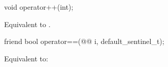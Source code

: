 %
\begin{itemdecl}
void operator++(int);
\end{itemdecl}

\begin{itemdescr}
\pnum
\effects
Equivalent to .
\end{itemdescr}

%
\begin{itemdecl}
friend bool operator==(@@ i, default_sentinel_t);
\end{itemdecl}

\begin{itemdescr}
\pnum
\effects
Equivalent to: 
\end{itemdescr}

